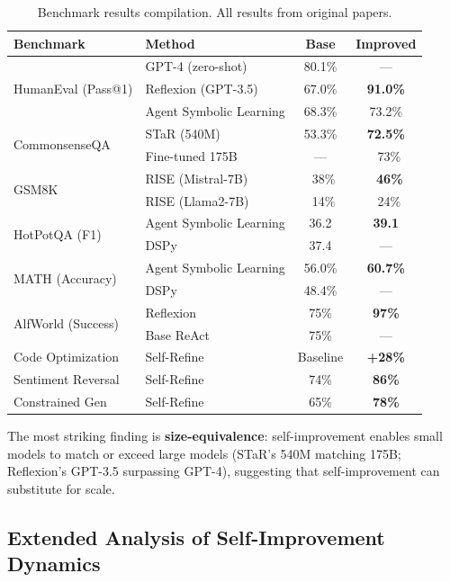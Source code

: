 \begin{table}[t]
\centering
\small
\caption{Benchmark results compilation. All results from original papers.}
\label{tab:benchmark_compilation}
\begin{tabular}{llcc}
\toprule
\textbf{Benchmark} & \textbf{Method} & \textbf{Base} & \textbf{Improved} \\
\midrule
\multirow{3}{*}{HumanEval (Pass@1)} & GPT-4 (zero-shot) & 80.1\% & --- \\
& Reflexion (GPT-3.5) & 67.0\% & \textbf{91.0\%} \\
& Agent Symbolic Learning & 68.3\% & 73.2\% \\
\midrule
\multirow{2}{*}{CommonsenseQA} & STaR (540M) & 53.3\% & \textbf{72.5\%} \\
& Fine-tuned 175B & --- & ~73\% \\
\midrule
\multirow{2}{*}{GSM8K} & RISE (Mistral-7B) & ~38\% & \textbf{~46\%} \\
& RISE (Llama2-7B) & ~14\% & ~24\% \\
\midrule
\multirow{2}{*}{HotPotQA (F1)} & Agent Symbolic Learning & 36.2 & \textbf{39.1} \\
& DSPy & 37.4 & --- \\
\midrule
\multirow{2}{*}{MATH (Accuracy)} & Agent Symbolic Learning & 56.0\% & \textbf{60.7\%} \\
& DSPy & 48.4\% & --- \\
\midrule
\multirow{2}{*}{AlfWorld (Success)} & Reflexion & 75\% & \textbf{97\%} \\
& Base ReAct & 75\% & --- \\
\midrule
Code Optimization & Self-Refine & Baseline & \textbf{+28\%} \\
Sentiment Reversal & Self-Refine & 74\% & \textbf{86\%} \\
Constrained Gen & Self-Refine & 65\% & \textbf{78\%} \\
\bottomrule
\end{tabular}
\end{table}

The most striking finding is \textbf{size-equivalence}: self-improvement enables small models to match or exceed large models (STaR's 540M matching 175B; Reflexion's GPT-3.5 surpassing GPT-4), suggesting that self-improvement can substitute for scale.

\subsection{Extended Analysis of Self-Improvement Dynamics}
\label{sec:extended-analysis}

